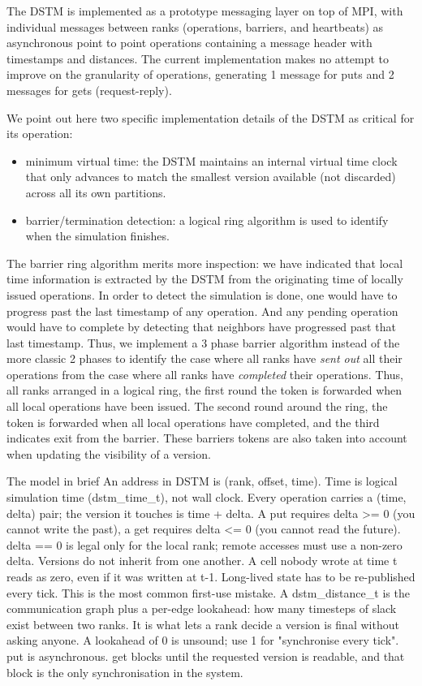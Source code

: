
The DSTM is implemented as a prototype messaging layer on top of MPI, with
individual messages between ranks (operations, barriers, and heartbeats) as
asynchronous point to point operations containing a message header with
timestamps and distances. The current implementation makes no attempt to improve
on the granularity of operations, generating 1 message for puts and 2 messages
for gets (request-reply).

We point out here two specific implementation details of the DSTM as critical for its operation:
\begin{itemize}
    \item minimum virtual time: the DSTM maintains an internal virtual time clock that only advances to match the smallest
    version available (not discarded) across all its own partitions.
    \item barrier/termination detection: a logical ring algorithm is used to identify when the simulation finishes.
\end{itemize}

The barrier ring algorithm merits more inspection: we have indicated that local
time information is extracted by the DSTM from the originating time of locally
issued operations. In order to detect the simulation is done, one would have to
progress past the last timestamp of any operation. And any pending operation
would have to complete by detecting that neighbors have progressed past that
last timestamp. Thus, we implement a 3 phase barrier algorithm instead of the
more classic 2 phases to identify the case where all ranks have \textit{sent out} all
their operations from the case where all ranks have \textit{completed} their operations.
Thus, all ranks arranged in a logical ring, the first round the token is
forwarded when all local operations have been issued. The second round around
the ring, the token is forwarded when all local operations have completed, and
the third indicates exit from the barrier. These barriers tokens are also taken into account when updating the visibility of a version.

The model in brief
An address in DSTM is (rank, offset, time). Time is logical simulation time (dstm_time_t), not wall clock.
Every operation carries a (time, delta) pair; the version it touches is time + delta.
A put requires delta >= 0 (you cannot write the past), a get requires delta <= 0 (you cannot read the future). delta == 0 is legal only for the local rank; remote accesses must use a non-zero delta.
Versions do not inherit from one another. A cell nobody wrote at time t reads as zero, even if it was written at t-1. Long-lived state has to be re-published every tick. This is the most common first-use mistake.
A dstm_distance_t is the communication graph plus a per-edge lookahead: how many timesteps of slack exist between two ranks. It is what lets a rank decide a version is final without asking anyone. A lookahead of 0 is unsound; use 1 for "synchronise every tick".
put is asynchronous. get blocks until the requested version is readable, and that block is the only synchronisation in the system.

